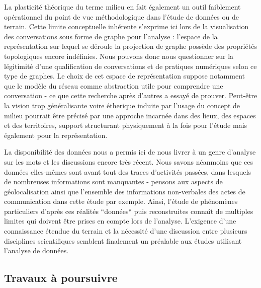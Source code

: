 La plasticit\'e th\'eorique du terme milieu en fait \'egalement un outil faiblement op\'erationnel du point de vue m\'ethodologique dans l{\textquoteright}\'etude de donn\'ees ou de terrain. Cette limite conceptuelle inh\'erente s{\textquoteright}exprime ici lors de la visualisation des conversations sous forme de graphe pour l{\textquoteright}analyse : l{\textquoteright}espace de la repr\'esentation sur lequel se d\'eroule la projection de graphe poss\`ede des propri\'et\'es topologiques encore ind\'efinies. Nous pouvons donc nous questionner sur la l\'egitimit\'e d{\textquoteright}une qualification de conversations et de pratiques num\'eriques selon ce type de graphes. Le choix de cet espace de repr\'esentation suppose notamment que le mod\`ele du r\'eseau comme abstraction utile pour comprendre une conversation - ce que cette recherche apr\`es d{\textquoteright}autres a essay\'e de prouver. Peut-\^etre la vision trop g\'en\'eralisante voire \'etherique induite par l{\textquoteright}usage du concept de milieu pourrait \^etre pr\'ecis\'e par une approche incarn\'ee dans des lieux, des espaces et des territoires, support structurant physiquement \`a la fois pour l{\textquoteright}\'etude mais \'egalement pour la repr\'esentation.


La disponibilit\'e des donn\'ees nous a permis ici de nous livrer \`a un genre d{\textquoteright}analyse sur les mots et les discussions encore tr\`es r\'ecent. Nous savons n\'eanmoins que ces donn\'ees elles-m\^emes sont avant tout des traces d{\textquoteright}activit\'es pass\'ees, dans lesquels de nombreuses informations sont manquantes - pensons aux aspects de g\'eolocalisation ainsi que l{\textquoteright}ensemble des informations non-verbales des actes de communication dans cette \'etude par exemple. Ainsi, l{\textquoteright}\'etude de ph\'enom\`enes particuliers d{\textquoteright}apr\`es ces r\'ealit\'es {\textquotedblleft}donn\'ees{\textquotedblleft} puis reconstruites conna\^it de multiples limites qui doivent \^etre prises en compte lors de l{\textquoteright}analyse. L{\textquoteright}exigence d{\textquoteright}une connaissance \'etendue du terrain et la n\'ecessit\'e d{\textquoteright}une discussion entre plusieurs disciplines scientifiques semblent finalement un pr\'ealable aux \'etudes utilisant l{\textquoteright}analyse de donn\'ees.

\subsection[Travaux \`a poursuivre]{Travaux \`a poursuivre} 
% 

